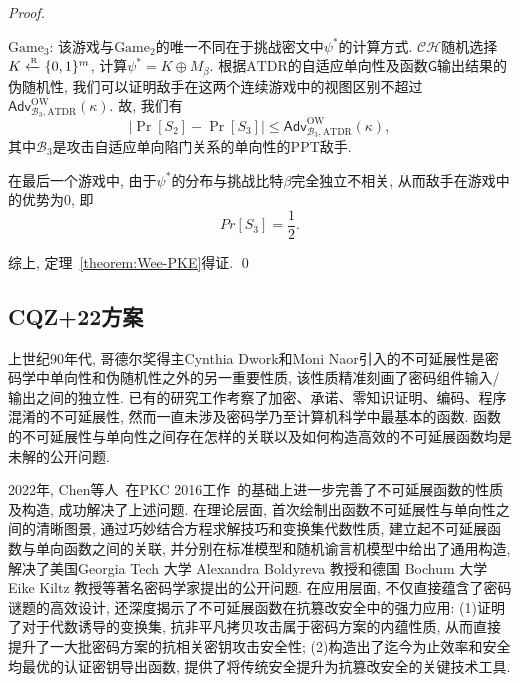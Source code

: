 \begin{proof}
\begin{trivlist}
\item $\text{Game}_3$: 该游戏与$\text{Game}_2$的唯一不同在于挑战密文中$\psi^*$的计算方式. $\mathcal{CH}$随机选择$K \xleftarrow{\textup{\tiny R}} \{0, 1\}^m$, 计算$\psi^* = K \oplus M_\beta$. 根据$\text{ATDR}$的自适应单向性及函数$\mathsf{G}$输出结果的伪随机性, 我们可以证明敌手在这两个连续游戏中的视图区别不超过$\mathsf{Adv}_{\mathcal{B}_3, \text{ATDR}}^{\text{OW}}(\kappa)$. 故, 我们有
\begin{equation*}
|\Pr[S_2] - \Pr[S_3]| \leq \mathsf{Adv}_{\mathcal{B}_3, \text{ATDR}}^{\text{OW}}(\kappa),
\end{equation*}
其中$\mathcal{B}_3$是攻击自适应单向陷门关系的单向性的PPT敌手.
\end{trivlist}

在最后一个游戏中, 由于$\psi^*$的分布与挑战比特$\beta$完全独立不相关, 从而敌手在游戏中的优势为0, 即
\[
Pr[S_3] = \frac{1}{2}.
\]

综上, 定理~\ref{theorem:Wee-PKE}得证. \qed
\end{proof}

\subsection{CQZ+22方案}
上世纪90年代, 哥德尔奖得主Cynthia Dwork和Moni Naor引入的不可延展性是密码学中单向性和伪随机性之外的另一重要性质, 该性质精准刻画了密码组件输入/输出之间的独立性. 已有的研究工作考察了加密、承诺、零知识证明、编码、程序混淆的不可延展性, 然而一直未涉及密码学乃至计算机科学中最基本的函数. 函数的不可延展性与单向性之间存在怎样的关联以及如何构造高效的不可延展函数均是未解的公开问题.

2022年, Chen等人~\cite{CQZDC-JOC-2022}在PKC 2016工作~\cite{Chen-PKC-2016}的基础上进一步完善了不可延展函数的性质及构造, 成功解决了上述问题. 在理论层面, 首次绘制出函数不可延展性与单向性之间的清晰图景, 通过巧妙结合方程求解技巧和变换集代数性质, 建立起不可延展函数与单向函数之间的关联, 并分别在标准模型和随机谕言机模型中给出了通用构造, 解决了美国Georgia Tech 大学 Alexandra Boldyreva 教授和德国 Bochum 大学 Eike Kiltz 教授等著名密码学家提出的公开问题. 在应用层面, 不仅直接蕴含了密码谜题的高效设计, 还深度揭示了不可延展函数在抗篡改安全中的强力应用: (1)证明了对于代数诱导的变换集, 抗非平凡拷贝攻击属于密码方案的内蕴性质, 从而直接提升了一大批密码方案的抗相关密钥攻击安全性; (2)构造出了迄今为止效率和安全均最优的认证密钥导出函数, 提供了将传统安全提升为抗篡改安全的关键技术工具.


